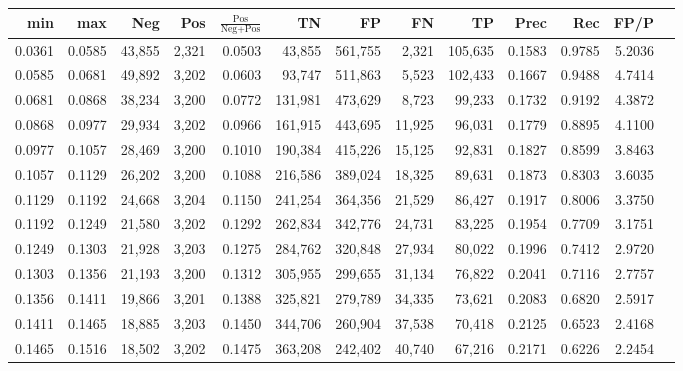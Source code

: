\begin{tabular}{rrrrrrrrrrrrr}
\toprule
   min &    max &    Neg &   Pos & $\frac{\text{Pos}}{\text{Neg}+\text{Pos}}$ &      TN &      FP &      FN &      TP &   Prec &    Rec &   FP/P \\
\midrule
0.0361 & 0.0585 & 43,855 & 2,321 &                                     0.0503 &  43,855 & 561,755 &   2,321 & 105,635 & 0.1583 & 0.9785 & 5.2036 \\
0.0585 & 0.0681 & 49,892 & 3,202 &                                     0.0603 &  93,747 & 511,863 &   5,523 & 102,433 & 0.1667 & 0.9488 & 4.7414 \\
0.0681 & 0.0868 & 38,234 & 3,200 &                                     0.0772 & 131,981 & 473,629 &   8,723 &  99,233 & 0.1732 & 0.9192 & 4.3872 \\
0.0868 & 0.0977 & 29,934 & 3,202 &                                     0.0966 & 161,915 & 443,695 &  11,925 &  96,031 & 0.1779 & 0.8895 & 4.1100 \\
0.0977 & 0.1057 & 28,469 & 3,200 &                                     0.1010 & 190,384 & 415,226 &  15,125 &  92,831 & 0.1827 & 0.8599 & 3.8463 \\
0.1057 & 0.1129 & 26,202 & 3,200 &                                     0.1088 & 216,586 & 389,024 &  18,325 &  89,631 & 0.1873 & 0.8303 & 3.6035 \\
0.1129 & 0.1192 & 24,668 & 3,204 &                                     0.1150 & 241,254 & 364,356 &  21,529 &  86,427 & 0.1917 & 0.8006 & 3.3750 \\
0.1192 & 0.1249 & 21,580 & 3,202 &                                     0.1292 & 262,834 & 342,776 &  24,731 &  83,225 & 0.1954 & 0.7709 & 3.1751 \\
0.1249 & 0.1303 & 21,928 & 3,203 &                                     0.1275 & 284,762 & 320,848 &  27,934 &  80,022 & 0.1996 & 0.7412 & 2.9720 \\
0.1303 & 0.1356 & 21,193 & 3,200 &                                     0.1312 & 305,955 & 299,655 &  31,134 &  76,822 & 0.2041 & 0.7116 & 2.7757 \\
0.1356 & 0.1411 & 19,866 & 3,201 &                                     0.1388 & 325,821 & 279,789 &  34,335 &  73,621 & 0.2083 & 0.6820 & 2.5917 \\
0.1411 & 0.1465 & 18,885 & 3,203 &                                     0.1450 & 344,706 & 260,904 &  37,538 &  70,418 & 0.2125 & 0.6523 & 2.4168 \\
0.1465 & 0.1516 & 18,502 & 3,202 &                                     0.1475 & 363,208 & 242,402 &  40,740 &  67,216 & 0.2171 & 0.6226 & 2.2454 \\

\end{tabular}

